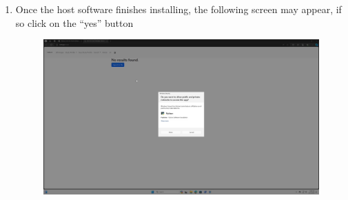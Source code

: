 \documentclass[12pt]{article}
\begin{document}
\begin{center}
\begin{enumerate}
\begin{figure}[H]
		      \end{figure}
		\item Once the host software finishes installing, the following screen may appear, if so click on the ``yes'' button
		      \begin{figure}[H]
			      \includegraphics[width=\textwidth]{Figures/Windows-Allow-Python.png}
		      \end{figure}
	\end{enumerate}

\end{center}
\end{document}
